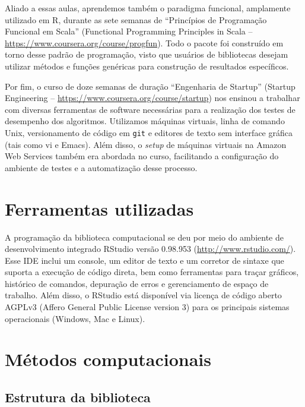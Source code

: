 Aliado a essas aulas, aprendemos também o paradigma funcional, amplamente utilizado em R, durante as sete semanas de ``Princípios de Programação Funcional em Scala'' (Functional Programming Principles in Scala -- \url{https://www.coursera.org/course/progfun}). Todo o pacote foi construído em torno desse padrão de programação, visto que usuários de bibliotecas desejam utilizar métodos e funções genéricas para construção de resultados específicos.

Por fim, o curso de doze semanas de duração ``Engenharia de Startup'' (Startup Engineering -- \url{https://www.coursera.org/course/startup}) nos ensinou a trabalhar com diversas ferramentas de software necessárias para a realização dos testes de desempenho dos algoritmos. Utilizamos máquinas virtuais, linha de comando Unix, versionamento de código em \texttt{git} e editores de texto sem interface gráfica (tais como vi e Emacs). Além disso, o \textit{setup} de máquinas virtuais na Amazon Web Services também era abordada no curso, facilitando a configuração do ambiente de testes e a automatização desse processo. 

\section{Ferramentas utilizadas} %
\label{sec:ferramentas_utilizadas}

A programação da biblioteca computacional se deu por meio do ambiente de desenvolvimento integrado RStudio versão 0.98.953 (\url{http://www.rstudio.com/}). Esse IDE inclui um console, um editor de texto e um corretor de sintaxe que suporta a execução de código direta, bem como ferramentas para traçar gráficos, histórico de comandos, depuração de erros e gerenciamento de espaço de trabalho. Além disso, o RStudio está disponível via licença de código aberto AGPLv3 (Affero General Public License version 3) para os principais sistemas operacionais (Windows, Mac e Linux).

\section{Métodos computacionais} %
\label{sec:m_todos_computacionais}

\subsection{Estrutura da biblioteca} %
\label{sub:estrutura_da_biblioteca}

